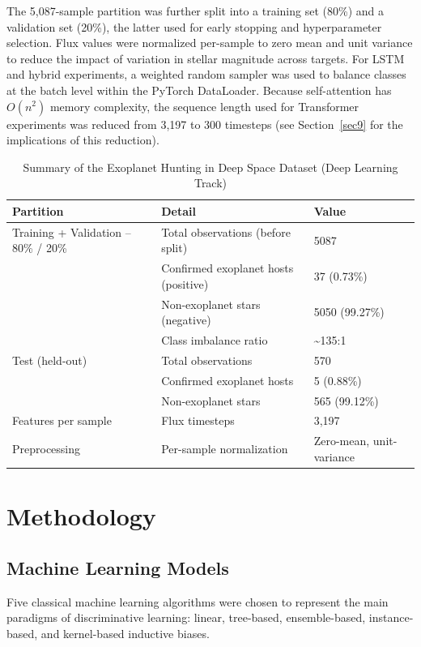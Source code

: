 \documentclass[preprint,11pt,times]{elsarticle}
\begin{document}
The 5,087-sample partition was further split into a training set (80\%) and a validation set (20\%), the latter used for early stopping and hyperparameter selection. Flux values were normalized per-sample to zero mean and unit variance to reduce the impact of variation in stellar magnitude across targets. For LSTM and hybrid experiments, a weighted random sampler was used to balance classes at the batch level within the PyTorch DataLoader. Because self-attention has $O(n^2)$ memory complexity, the sequence length used for Transformer experiments was reduced from 3,197 to 300 timesteps (see Section~\ref{sec9} for the implications of this reduction).

\begin{table}[h]
\caption{Summary of the Exoplanet Hunting in Deep Space Dataset (Deep Learning Track)}\label{tab2}%
\begin{tabular}{@{}lll@{}}
\toprule
Partition & Detail & Value \\
\midrule
Training + Validation -- 80\% / 20\% & Total observations (before split) & 5087 \\
 & Confirmed exoplanet hosts (positive) & 37 (0.73\%) \\
 & Non-exoplanet stars (negative) & 5050 (99.27\%) \\
 & Class imbalance ratio & \textasciitilde135:1 \\
Test (held-out) & Total observations & 570 \\
 & Confirmed exoplanet hosts & 5 (0.88\%) \\
 & Non-exoplanet stars & 565 (99.12\%) \\
Features per sample & Flux timesteps & 3,197 \\
Preprocessing & Per-sample normalization & Zero-mean, unit-variance \\
\bottomrule
\end{tabular}
\end{table}

\section{Methodology}\label{sec4}

\subsection{Machine Learning Models}\label{subsec4a}

Five classical machine learning algorithms were chosen to represent the main paradigms of discriminative learning: linear, tree-based, ensemble-based, instance-based, and kernel-based inductive biases.
\end{document}
